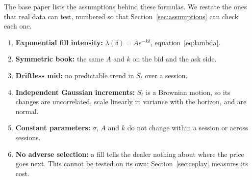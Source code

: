 The base paper lists the assumptions behind these formulas. We restate the ones that real data can
test, numbered so that Section~\ref{sec:assumptions} can check each one.
\begin{enumerate}
\item[\textbf{A1}] \textbf{Exponential fill intensity:} $\lambda(\delta)=Ae^{-k\delta}$, equation~\eqref{eq:lambda}.
\item[\textbf{A2}] \textbf{Symmetric book:} the same $A$ and $k$ on the bid and the ask side.
\item[\textbf{A3}] \textbf{Driftless mid:} no predictable trend in $S_t$ over a session.
\item[\textbf{A4}] \textbf{Independent Gaussian increments:} $S_t$ is a Brownian motion, so its
  changes are uncorrelated, scale linearly in variance with the horizon, and are normal.
\item[\textbf{A5}] \textbf{Constant parameters:} $\sigma$, $A$ and $k$ do not change within
  a session or across sessions.
\item[\textbf{A6}] \textbf{No adverse selection:} a fill tells the dealer nothing about where the
  price goes next. This cannot be tested on its own; Section~\ref{sec:replay} measures its cost.
\end{enumerate}

